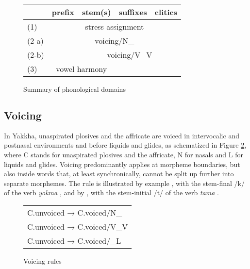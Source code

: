 

\begin{figure}[htp]
\begin{center}
\begin{tabular}{l|l|l|l|l} 
 \hline
	&{\bf prefix}&{\bf stem(s)}&{\bf suffixes}&{\bf clitics}\\
\hline
(1)	&\cellcolor[gray]{.8}	&\multicolumn{2}{c|}{stress assignment}&\cellcolor[gray]{.8}\\
\hline
(2-a)&	\multicolumn{4}{c}{voicing/N\_}\\
\hline
(2-b)&\cellcolor[gray]{.8}	&\multicolumn{3}{c}{voicing/V\_V}\\
\hline
(3)&\multicolumn{2}{c|}{vowel harmony}&\cellcolor[gray]{.8}&\cellcolor[gray]{.8}\\
\hline
\end{tabular}
\caption{Summary of phonological domains}\label{w-domains}
\end{center}
\end{figure}


\subsection{Voicing}\label{voicing}

In Yakkha, unaspirated plosives and the affricate are voiced in intervocalic and postnasal environments and before liquids and glides, as schematized in Figure \ref{voic-fig}, where C stands for unaspirated plosives and the affricate, N for nasals and L for liquids and glides. Voicing predominantly  applies at morpheme boundaries, but also inside words that, at least synchronically, cannot be split up further into separate morphemes. The rule is illustrated by example \Next, with the stem-final /k/ of the verb \emph{yokma} , and by \NNext, with the stem-initial /t/ of the verb \emph{tama} . 

\begin{figure}[htp]	
\begin{center}		
\begin{tabular}{l}
\hline
C.{\sc unvoiced} → C.{\sc voiced}/N\_\\
C.{\sc unvoiced} → C.{\sc voiced}/V\_V\\ 
C.{\sc unvoiced} → C.{\sc voiced}/\_L\\
\hline
\end{tabular}
\caption{Voicing rules}\label{voic-fig}
\end{center}
\end{figure}


